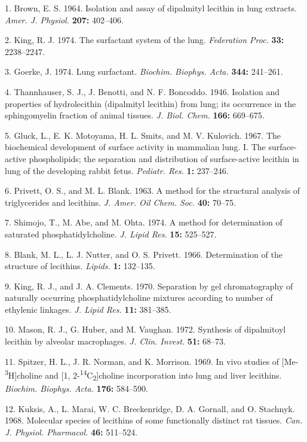 \documentclass{article}
\begin{document}
\begin{hangpars}\small
1. Brown, E. S. 1964. Isolation and assay of dipalmityl lecithin in lung extracts. \emph{Amer. J. Physiol.} \textbf{207:} 402–406.

2. King, R. J. 1974. The surfactant system of the lung. \emph{Federation Proc.} \textbf{33:} 2238–2247.

3. Goerke, J. 1974. Lung surfactant. \emph{Biochim. Biophys. Acta.} \textbf{344:} 241–261.

4. Thannhauser, S. J., J. Benotti, and N. F. Boncoddo. 1946. Isolation and properties of hydrolecithin (dipalmityl lecithin) from lung; its occurrence in the sphingomyelin fraction of animal tissues. \emph{J. Biol. Chem.} \textbf{166:} 669–675.

5. Gluck, L., E. K. Motoyama, H. L. Smits, and M. V. Kulovich. 1967. The biochemical development of surface activity in mammalian lung. I. The surface-active phospholipids; the separation and distribution of surface-active lecithin in lung of the developing rabbit fetus. \emph{Pediatr. Res.} \textbf{1:} 237–246.

6. Privett, O. S., and M. L. Blank. 1963. A method for the structural analysis of triglycerides and lecithins. \emph{J. Amer. Oil Chem. Soc.} \textbf{40:} 70–75.

7. Shimojo, T., M. Abe, and M. Ohta. 1974. A method for determination of saturated phosphatidylcholine. \emph{J. Lipid Res.} \textbf{15:} 525–527.

8. Blank, M. L., L. J. Nutter, and O. S. Privett. 1966. Determination of the structure of lecithins. \emph{Lipids.} \textbf{1:} 132–135.

9. King, R. J., and J. A. Clements. 1970. Separation by gel chromatography of naturally occurring phosphatidylcholine mixtures according to number of ethylenic linkages. \emph{J. Lipid Res.} \textbf{11:} 381–385.

10. Mason, R. J., G. Huber, and M. Vaughan. 1972. Synthesis of dipalmitoyl lecithin by alveolar macrophages. \emph{J. Clin. Invest.} \textbf{51:} 68–73.

11. Spitzer, H. L., J. R. Norman, and K. Morrison. 1969. In vivo studies of [Me-\textsuperscript{3}H]choline and [1, 2-\textsuperscript{14}C\textsubscript{2}]choline incorporation into lung and liver lecithins. \emph{Biochim. Biophys. Acta.} \textbf{176:} 584–590.

12. Kuksis, A., L. Marai, W. C. Breckenridge, D. A. Gornall, and O. Stachnyk. 1968. Molecular species of lecithins of some functionally distinct rat tissues. \emph{Can. J. Physiol. Pharmacol.} \textbf{46:} 511–524.


\end{hangpars}
\end{document}
